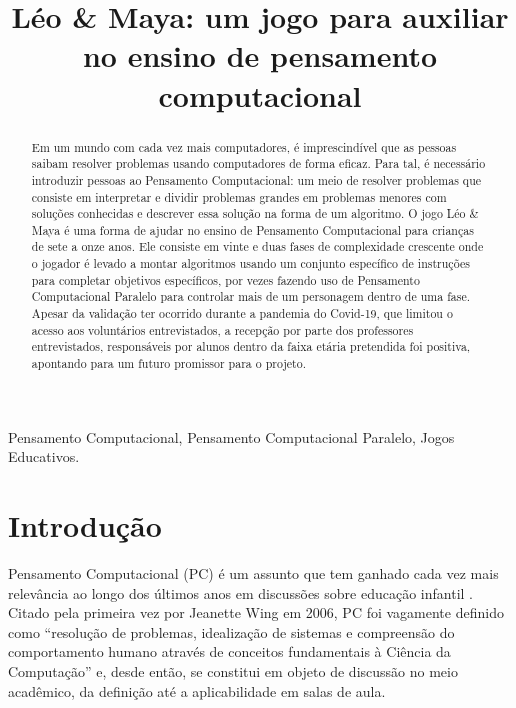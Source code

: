 \documentclass[conference]{IEEEtran}
\begin{document}
\title{Léo \& Maya: um jogo para auxiliar no ensino de pensamento computacional
}


%

\maketitle


\begin{abstract}
Em um mundo com cada vez mais computadores, é imprescindível que as pessoas saibam resolver problemas usando computadores de forma eficaz. Para tal, é necessário introduzir pessoas ao Pensamento Computacional: um meio de resolver problemas que consiste em interpretar e dividir problemas grandes em problemas menores com soluções conhecidas e descrever essa solução na forma de um algoritmo. O jogo Léo \& Maya é uma forma de ajudar no ensino de Pensamento Computacional para crianças de sete a onze anos. Ele consiste em vinte e duas fases de complexidade crescente onde o jogador é levado a montar algoritmos usando um conjunto específico de instruções para completar objetivos específicos, por vezes fazendo uso de Pensamento Computacional Paralelo para controlar mais de um personagem dentro de uma fase. Apesar da validação ter ocorrido durante a pandemia do Covid-19, que limitou o acesso aos voluntários entrevistados, a recepção por parte dos professores entrevistados, responsáveis por alunos dentro da faixa etária pretendida foi positiva, apontando para um futuro promissor para o projeto.
\end{abstract}

\renewcommand{\IEEEkeywordsname}{Palavras-Chave}
\begin{IEEEkeywords}
Pensamento Computacional, Pensamento Computacional Paralelo, Jogos Educativos.
\end{IEEEkeywords}

\section{Introdução}

Pensamento Computacional (PC) é um assunto que tem ganhado cada vez mais relevância ao longo dos últimos anos em discussões sobre educação infantil \cite{b1}. Citado pela primeira vez por Jeanette Wing em 2006, PC foi vagamente definido como ``resolução de problemas, idealização de sistemas e compreensão do comportamento humano através de conceitos fundamentais à Ciência da Computação''\cite{b2} e, desde então, se constitui em objeto de discussão no meio acadêmico, da definição até a aplicabilidade em salas de aula.
\end{document}
